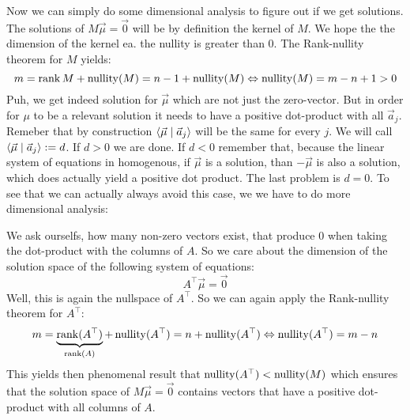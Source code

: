 Now we can simply do some dimensional analysis to figure out if we get solutions. The solutions of $M\vec\mu = \vec0$ will be by definition the kernel of $M$. We hope the the dimension of the kernel ea. the nullity is greater than 0. The Rank-nullity theorem for $M$ yields:
$$m = \operatorname{rank}{M} + \operatorname{nullity}(M) = n-1 + \operatorname{nullity}(M) \Leftrightarrow \operatorname{nullity}(M) = m - n + 1 > 0$$
Puh, we get indeed solution for $\vec\mu$ which are not just the zero-vector. But in order for $\mu$ to be a relevant solution it needs to have a positive dot-product with all $\vec a_j$. Remeber that by construction $\langle \vec\mu \mid \vec a_j \rangle$ will be the same for every $j$. We will call $\langle \vec\mu \mid \vec a_j \rangle := d$. If $d > 0$ we are done. If $d < 0$ remember that, because the linear system of equations in homogenous, if $\vec\mu$ is a solution, than $-\vec\mu$ is also a solution, which does actually yield a positive dot product. The last problem is $d = 0$. To see that we can actually always avoid this case, we we have to do more dimensional analysis:

We ask ourselfs, how many non-zero vectors exist, that produce 0 when taking the dot-product with the columns of $A$. So we care about the dimension of the solution space of the following system of equations:
$$A^\top\vec\mu = \vec0$$
Well, this is again the nullspace of $A^\top$. So we can again apply the Rank-nullity theorem for $A^\top$:
$$m = \underbrace{\operatorname{rank}(A^\top)}_{\operatorname{rank}(A)} + \operatorname{nullity}(A^\top) = n + \operatorname{nullity}(A^\top) \Leftrightarrow \operatorname{nullity}(A^\top) = m - n$$
This yields then phenomenal result that $\operatorname{nullity}(A^\top) < \operatorname{nullity}(M)$ which ensures that the solution space of $M\vec\mu = \vec0$ contains vectors that have a positive dot-product with all columns of $A$.

